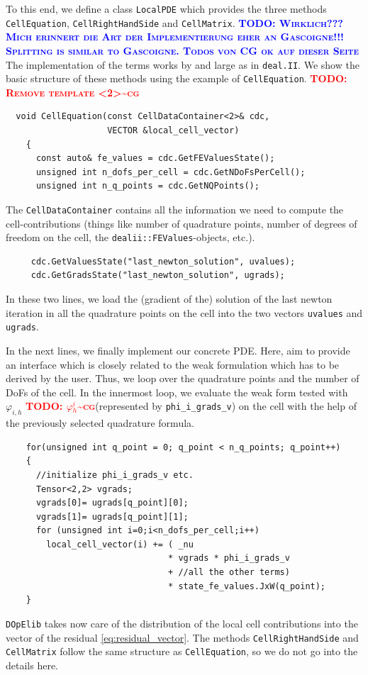 \documentclass[prodmode,acmtoms]{acmsmall}
\numberwithin{equation}{section}
\renewcommand{\phi}{\varphi}
\newcommand{\deal}{\texttt{deal.II}}
\newcommand{\dope}{\texttt{DOpElib}}
\newcommand{\todo}[1]{\textbf{\textsc{\textcolor{blue}{TODO: #1}}}}
\newcommand{\todocg}[1]{\textbf{\textsc{\textcolor{red}{TODO: #1\textasciitilde cg}}}}
\begin{document}
To this end, we define a class \texttt{LocalPDE} which provides the three methods
\texttt{CellEquation}, \texttt{CellRightHandSide} and \texttt{CellMatrix}. 
\todo{Wirklich??? Mich erinnert die Art der Implementierung eher an
  Gascoigne!!! Splitting is similar to Gascoigne. Todos von CG ok auf dieser Seite}
The implementation of the terms works by and large as in \deal{}. We show the basic structure of these methods using the example of \texttt{CellEquation}.
\todocg{Remove template <2>}
\begin{lstlisting}
  void CellEquation(const CellDataContainer<2>& cdc,
                    VECTOR &local_cell_vector)
    {
      const auto& fe_values = cdc.GetFEValuesState();
      unsigned int n_dofs_per_cell = cdc.GetNDoFsPerCell();
      unsigned int n_q_points = cdc.GetNQPoints();
\end{lstlisting}
 The \texttt{CellDataContainer} contains all the information we need to compute the cell-contributions (things like number of quadrature points, number of degrees of freedom on the cell, the \texttt{dealii::FEValues}-objects, etc.).
  \begin{lstlisting}
     cdc.GetValuesState("last_newton_solution", uvalues);
     cdc.GetGradsState("last_newton_solution", ugrads);
 \end{lstlisting}
 In these two lines, we load the (gradient of the) solution of the last newton iteration in all the quadrature points on the cell into the two vectors \texttt{uvalues} and \texttt{ugrads}.

In the next lines, we finally implement our concrete PDE. Here, aim to provide 
an interface which is closely related to the weak formulation which 
has to be derived by the user. Thus,
we loop over the quadrature points and the number of DoFs of the cell. In the innermost loop, we evaluate the weak form tested with $\phi_{i,h}$ \todocg{$\phi_h^i$}(represented by \texttt{phi\_i\_grads\_v}) on the cell with the help of the previously selected quadrature formula. 
 \begin{lstlisting}
    for(unsigned int q_point = 0; q_point < n_q_points; q_point++)
    {
      //initialize phi_i_grads_v etc.
      Tensor<2,2> vgrads;
      vgrads[0]= ugrads[q_point][0]; 
      vgrads[1]= ugrads[q_point][1];
      for (unsigned int i=0;i<n_dofs_per_cell;i++)
        local_cell_vector(i) += ( _nu 
                                * vgrads * phi_i_grads_v 
                                + //all the other terms)
                                * state_fe_values.JxW(q_point);
    }
\end{lstlisting}
\dope{} takes now care of the distribution of the local cell contributions into  the vector of the residual \eqref{eq:residual_vector}. The methods \texttt{CellRightHandSide} and \texttt{CellMatrix} follow the same structure as 
\texttt{CellEquation}, so we do not go into the details here.
\end{document}
